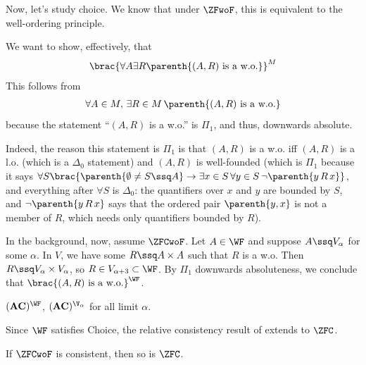 Now, let's study choice. We know that under $\ZFwoF$, this is equivalent to the well-ordering principle.

We want to show, effectively, that
\begin{align*}
    \brac{\forall A \exists R \parenth{(A, R) \text{ is a w.o.}}}^M
\end{align*}
This follows from
\begin{align*}
    \forall A \in M, \, \exists R \in M \, \parenth{(A, R) \text{ is a w.o.}}
\end{align*}
because the statement ``$(A, R)$ is a w.o.'' is $\Pi_1$, and thus, downwards absolute.

Indeed, the reason this statement is $\Pi_1$ is that $(A, R)$ is a w.o. iff $(A, R)$ is a l.o. (which is a $\Delta_0$ statement) and $(A, R)$ is well-founded (which is $\Pi_1$ because it says $\forall S \brac{\parenth{\emptyset \ne S \ssq A} \to \exists x \in S \, \forall y \in S \, \neg\parenth{y \, R \, x}}$, and everything after $\forall S$ is $\Delta_0$: the quantifiers over $x$ and $y$ are bounded by $S$, and $\neg\parenth{y \, R \, x}$ says that the ordered pair $\parenth{y, x}$ is not a member of $R$, which needs only quantifiers bounded by $R$). %

In the background, now, assume $\ZFCwoF$. Let $A \in \WF$ and suppose $A \ssq V_{\alpha}$ for some $\alpha$. In $V$, we have some $R \ssq A \times A$ such that $R$ is a w.o. Then $R \ssq V_{\alpha} \times V_{\alpha}$, so $R \in V_{\alpha + 3} \subset \WF$. By $\Pi_1$ downwards absoluteness, we conclude that $\brac{(A, R) \text{ is a w.o.}}^{\WF}$.

\begin{boxcorollary}
    $(\mathbf{AC})^{\WF}$, $(\mathbf{AC})^{\V_{\alpha}}$ for all limit $\alpha$.
\end{boxcorollary}

Since $\WF$ satisfies Choice, the relative consistency result of  extends to $\ZFC$.

\begin{boxcorollary}
    If $\ZFCwoF$ is consistent, then so is $\ZFC$.
\end{boxcorollary}

